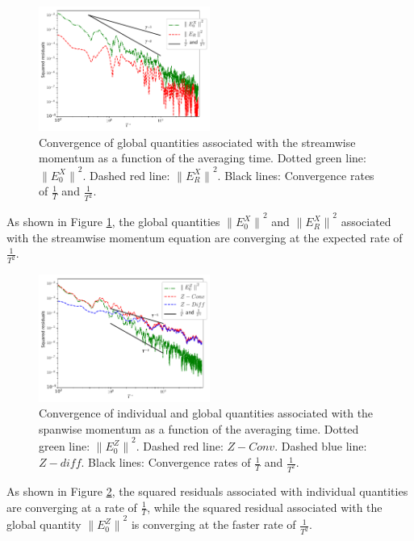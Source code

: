 \documentclass[aip,pof,reprint]{revtex4-1}
\begin{document}
\begin{figure}
\includegraphics[width=0.5\textwidth]{streamwise_convergence.pdf}
\caption{\label{fig_x}Convergence of global quantities associated with the streamwise momentum as a function of the averaging time. Dotted green line: ${\parallel{E_0^X}\parallel}^2$. Dashed red line: ${\parallel{E^X_R}\parallel}^2$. Black lines: Convergence rates of $\frac{1}{T}$ and $\frac{1}{T^2}$.}
\end{figure}

As shown in Figure \ref{fig_x}, the global quantities ${\parallel{E_0^X}\parallel}^2$ and ${\parallel{E^X_R}\parallel}^2$ associated with the streamwise momentum equation are converging at the expected rate of $\frac{1}{T^2}$.

\begin{figure}
\includegraphics[width=0.5\textwidth]{spanwise_convergence.pdf}
\caption{\label{fig_z}Convergence of individual and global quantities associated with the spanwise momentum as a function of the averaging time. Dotted green line: ${\parallel{E_0^Z}\parallel}^2$. Dashed red line: $Z-Conv$. Dashed blue line: $Z-diff$. Black lines: Convergence rates of $\frac{1}{T}$ and $\frac{1}{T^2}$.}
\end{figure}

As shown in Figure \ref{fig_z}, the squared residuals associated with individual quantities are converging at a rate of $\frac{1}{T}$, while the squared residual associated with the global quantity ${\parallel{E_0^Z}\parallel}^2$ is converging at the faster rate of $\frac{1}{T^2}$.
\end{document}

